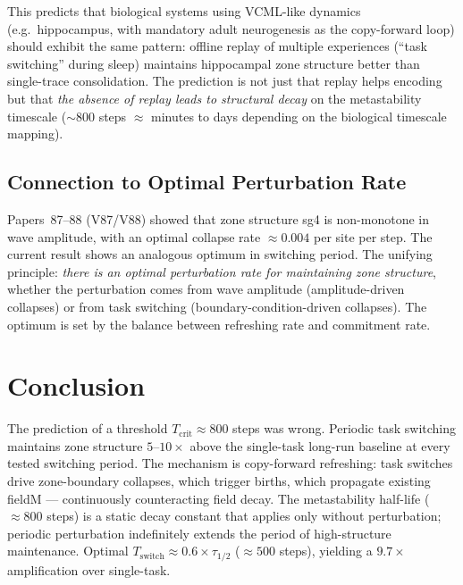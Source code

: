 \documentclass[11pt]{article}
\begin{document}
This predicts that biological systems using VCML-like dynamics (e.g.\ hippocampus,
with mandatory adult neurogenesis as the copy-forward loop) should exhibit the same
pattern: offline replay of multiple experiences (``task switching'' during sleep)
maintains hippocampal zone structure better than single-trace consolidation.
The prediction is not just that replay helps encoding but that \emph{the absence of
replay leads to structural decay} on the metastability timescale ($\sim 800$ steps
$\approx$ minutes to days depending on the biological timescale mapping).

\subsection{Connection to Optimal Perturbation Rate}

Papers~87--88 (V87/V88) showed that zone structure sg4 is non-monotone in wave
amplitude, with an optimal collapse rate $\approx 0.004$ per site per step.
The current result shows an analogous optimum in switching period.
The unifying principle: \emph{there is an optimal perturbation rate for maintaining
zone structure}, whether the perturbation comes from wave amplitude (amplitude-driven
collapses) or from task switching (boundary-condition-driven collapses).
The optimum is set by the balance between refreshing rate and commitment rate.

\section{Conclusion}

The prediction of a threshold $T_\mathrm{crit} \approx 800$ steps was wrong.
Periodic task switching maintains zone structure $5$--$10\times$ above the single-task
long-run baseline at every tested switching period.
The mechanism is copy-forward refreshing: task switches drive zone-boundary collapses,
which trigger births, which propagate existing fieldM --- continuously counteracting
field decay.
The metastability half-life ($\approx 800$ steps) is a static decay constant that
applies only without perturbation; periodic perturbation indefinitely extends the
period of high-structure maintenance.
Optimal $T_\mathrm{switch} \approx 0.6 \times \tau_{1/2}$ ($\approx 500$ steps),
yielding a $9.7\times$ amplification over single-task.
\end{document}
